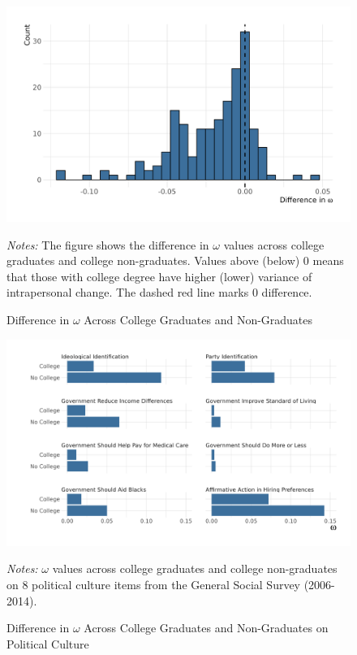 \documentclass[
  12pt,
]{article}
\begin{document}
\begin{figure}[ht]
\begin{center}
\caption{Difference in $\omega$ Across College Graduates and Non-Graduates}

\includegraphics{../figures/figure_3.png}

\end{center}
\footnotesize{\textit{Notes:} The figure shows the difference in $\omega$ values across college graduates and college non-graduates. Values above (below) 0 means that those with college degree have higher (lower) variance of intrapersonal change. The dashed red line marks 0 difference.}
\end{figure}

\newpage

\begin{figure}[ht]
\begin{center}
\caption{Difference in $\omega$ Across College Graduates and Non-Graduates on Political Culture}

\includegraphics{../figures/figure_4.png}

\end{center}
\footnotesize{\textit{Notes:} $\omega$ values across college graduates and college non-graduates on 8 political culture items from the General Social Survey (2006-2014).}
\end{figure}
\end{document}
